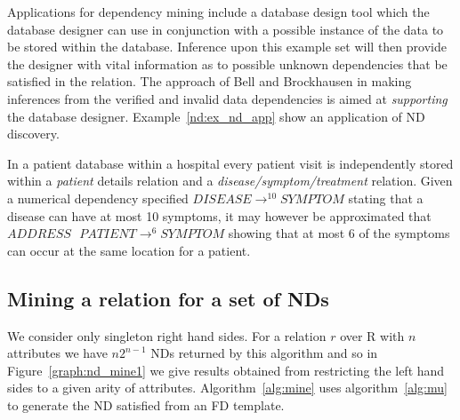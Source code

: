 \smallskip

Applications for dependency mining include a database
design tool which the database designer can use in conjunction with a possible
instance of the data to be stored within the database.  Inference upon this 
example set will then provide the designer with vital information as to possible
unknown dependencies that be satisfied in the relation. The approach of 
Bell and Brockhausen \cite{bb95} in making inferences from the verified and
invalid data dependencies is aimed at {\em supporting} the database
designer. Example~\ref{nd:ex_nd_app} show an application of ND discovery.


\begin{example}\label{nd:ex_nd_app}
\begin{rm}
In a patient database within a hospital every patient visit is
independently stored within a {\em patient} details relation and a {\em
disease/symptom/treatment} relation.  
Given a numerical dependency specified $DISEASE \to^{10} SYMPTOM$ stating
that a disease can have at most 10 symptoms, it may however be approximated
that $ADDRESS \: \: \: PATIENT \to^{6} SYMPTOM$ showing that at most
6 of the symptoms can occur at the same location for a patient.
\end{rm}
\end{example}


\subsection{Mining a relation for a set of NDs}

We consider only singleton right hand sides. For a relation $r$ over R with
$n$ attributes we have $n 2^{n-1}$ NDs returned by this algorithm and
so in Figure~\ref{graph:nd_mine1} we give results obtained from restricting the
left hand sides to a given arity of
attributes. Algorithm~\ref{alg:mine} uses algorithm~\ref{alg:mu} to
generate the ND satisfied from an FD template.

\medskip

